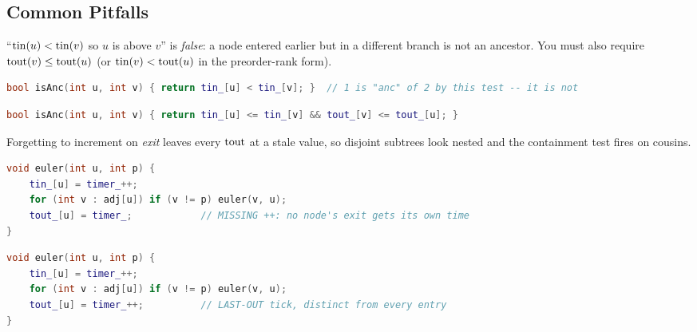 \subsection{Common Pitfalls}\label{sec:c24-times-pitfalls}

\begin{warningbox}
``$\operatorname{tin}(u) < \operatorname{tin}(v)$ so $u$ is above $v$'' is \emph{false}: a node entered earlier but in a
different branch is not an ancestor. You must also require $\operatorname{tout}(v) \le \operatorname{tout}(u)$ (or
$\operatorname{tin}(v) < \operatorname{tout}(u)$ in the preorder-rank form).
\end{warningbox}
\begin{lstlisting}[caption={\textcolor{warningred}{WRONG}: entry time alone is not containment}, language=C++, basicstyle=\ttfamily\small]
bool isAnc(int u, int v) { return tin_[u] < tin_[v]; }  // 1 is "anc" of 2 by this test -- it is not
\end{lstlisting}
\begin{lstlisting}[caption={\textcolor{successgreen}{RIGHT}: require the exit time too}, language=C++, basicstyle=\ttfamily\small]
bool isAnc(int u, int v) { return tin_[u] <= tin_[v] && tout_[v] <= tout_[u]; }
\end{lstlisting}

\begin{warningbox}
Forgetting to increment on \emph{exit} leaves every $\operatorname{tout}$ at a stale value, so disjoint
subtrees look nested and the containment test fires on cousins.
\end{warningbox}
\begin{lstlisting}[caption={\textcolor{warningred}{WRONG}: stamps \code{tout} but never advances the clock}, language=C++, basicstyle=\ttfamily\small]
void euler(int u, int p) {
    tin_[u] = timer_++;
    for (int v : adj[u]) if (v != p) euler(v, u);
    tout_[u] = timer_;            // MISSING ++: no node's exit gets its own time
}
\end{lstlisting}
\begin{lstlisting}[caption={\textcolor{successgreen}{RIGHT}: advance the clock on the way out}, language=C++, basicstyle=\ttfamily\small]
void euler(int u, int p) {
    tin_[u] = timer_++;
    for (int v : adj[u]) if (v != p) euler(v, u);
    tout_[u] = timer_++;          // LAST-OUT tick, distinct from every entry
}
\end{lstlisting}


